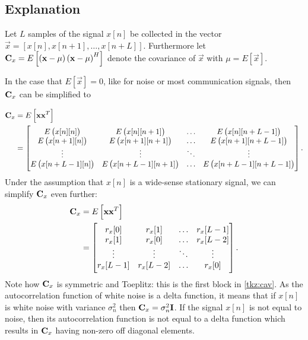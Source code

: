 \documentclass[a4paper, openany, oneside]{memoir}
\begin{document}
\subsection{Explanation}
Let $L$ samples of the signal $x[n]$ be collected in the vector $\vec{x} = \left[x[n], x[n+1], \ldots, x[n+L]\right]$. 
Furthermore let $\boldsymbol{\mathbf{C}}_x = E\left[\left(\boldsymbol{\mathbf{x}} - \mu \right)\left(\boldsymbol{\mathbf{x}} - \mu \right)^H\right]$ denote the covariance of $\vec{x}$ with $\mu = E[\vec{x}]$.

In the case that $E\left[\vec{x}\right]=0$, like for noise or most communication signals, then $\boldsymbol{\mathbf{C}}_x$ can be simplified to

\begin{align*}
\boldsymbol{\mathbf{C}}_x &= E\left[\boldsymbol{\mathbf{x}}\boldsymbol{\mathbf{x}}^T\right] \\
&= \begin{bmatrix} 
E\left(x[n][n]\right) & E\left(x[n][n+1]\right) & \ldots & E\left(x[n][n+L-1]\right) \\
E\left(x[n+1][n]\right) & E\left(x[n+1][n+1]\right) & \ldots & E\left(x[n+1][n+L-1]\right) \\
\vdots & \vdots & \ddots & \vdots \\
E\left(x[n+L-1][n]\right) & E\left(x[n+L-1][n+1]\right) & \ldots & E\left(x[n+L-1][n+L-1]\right) \\
\end{bmatrix}.
\end{align*}
Under the assumption that $x[n]$ is a wide-sense stationary signal, we can simplify $\boldsymbol{\mathbf{C}}_x$ even further:
\begin{align*}
\boldsymbol{\mathbf{C}}_x &= E\left[\boldsymbol{\mathbf{x}}\boldsymbol{\mathbf{x}}^T\right] \\
&= \begin{bmatrix} 
r_x[0] & r_x[1] & \ldots & r_x[L-1] \\
r_x[1] & r_x[0] & \ldots & r_x[L-2] \\
\vdots & \vdots & \ddots & \vdots \\
r_x[L-1] & r_x[L-2] & \ldots & r_x[0] \\
\end{bmatrix}.
\end{align*}
Note how $\boldsymbol{\mathbf{C}}_x$ is symmetric and Toeplitz: this is the first block in \cref{tkz:cav}. As  the autocorrelation function of white noise is a delta function, it means that  if $x[n]$ is white noise with variance $\sigma_n^2$ then $\boldsymbol{\mathbf{C}}_x = \sigma_n^2\boldsymbol{\mathbf{I}}$.
If the signal $x[n]$ is not equal to noise, then its autocorrelation function is not equal to a delta function which results in $\boldsymbol{\mathbf{C}}_x$ having non-zero off diagonal elements.
\end{document}
